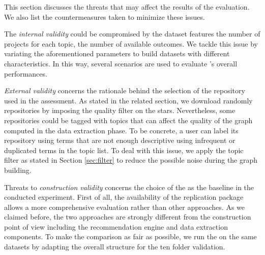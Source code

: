 This section discusses the threats that may affect the results of the evaluation. We also list the countermeasures taken to minimize these issues.

The \emph{internal validity} could be compromised by the dataset features \ie the number of projects for each topic, the number of available outcomes. We tackle this issue by variating the aforementioned parameters to build datasets with different characteristics. In this way, several scenarios are used to evaluate \CT's overall performances.

\emph{External validity} concerns the rationale behind the selection of the \GH repository used in the assessment. As stated in the related section, we download randomly repositories by imposing the quality filter on the stars. Nevertheless, some repositories could be tagged with topics that can affect the quality of the graph computed in the data extraction phase. To be concrete, a user can label its repository using terms that are not enough descriptive \ie using infrequent or duplicated terms in the topic list. To deal with this issue, we apply the topic filter as stated in Section \ref{sec:filter} to reduce the possible noise during the graph building.

Threats to \emph{construction validity} concerns the choice of the \MNB as the baseline in the conducted experiment. First of all, the availability of the replication package allows a more comprehensive evaluation rather than other approaches. As we claimed before, the two approaches are strongly different from the construction point of view including the recommendation engine and data extraction components. To make the comparison as fair as possible, we run the \MNB on the same datasets by adapting the overall structure for the ten folder validation.